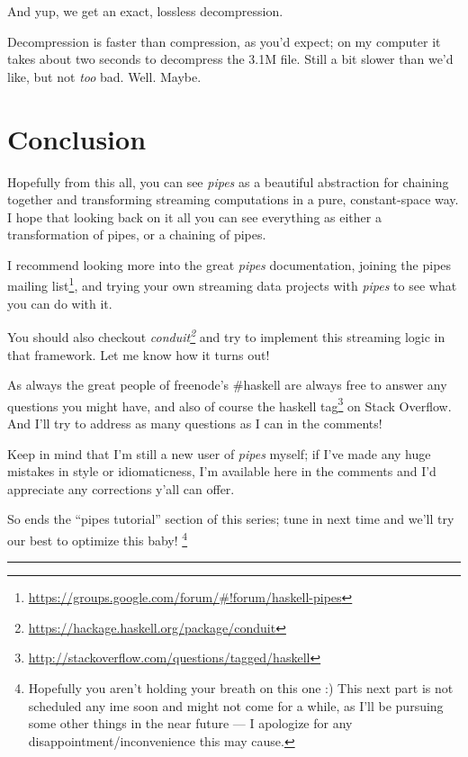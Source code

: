\documentclass[]{article}
\renewcommand{\href}[2]{#2\footnote{\url{#1}}}
\begin{document}
And yup, we get an exact, lossless decompression.

Decompression is faster than compression, as you'd expect; on my computer it
takes about two seconds to decompress the 3.1M file. Still a bit slower than
we'd like, but not \emph{too} bad. Well. Maybe.

\section{Conclusion}\label{conclusion}

Hopefully from this all, you can see \emph{pipes} as a beautiful abstraction for
chaining together and transforming streaming computations in a pure,
constant-space way. I hope that looking back on it all you can see everything as
either a transformation of pipes, or a chaining of pipes.

I recommend looking more into the great \emph{pipes} documentation, joining the
\href{https://groups.google.com/forum/\#!forum/haskell-pipes}{pipes mailing
list}, and trying your own streaming data projects with \emph{pipes} to see what
you can do with it.

You should also checkout
\emph{\href{https://hackage.haskell.org/package/conduit}{conduit}} and try to
implement this streaming logic in that framework. Let me know how it turns out!

As always the great people of freenode's \#haskell are always free to answer any
questions you might have, and also of course the
\href{http://stackoverflow.com/questions/tagged/haskell}{haskell tag} on Stack
Overflow. And I'll try to address as many questions as I can in the comments!

Keep in mind that I'm still a new user of \emph{pipes} myself; if I've made any
huge mistakes in style or idiomaticness, I'm available here in the comments and
I'd appreciate any corrections y'all can offer.

So ends the ``pipes tutorial'' section of this series; tune in next time and
we'll try our best to optimize this baby! \footnote{Hopefully you aren't holding
  your breath on this one :) This next part is not scheduled any ime soon and
  might not come for a while, as I'll be pursuing some other things in the near
  future --- I apologize for any disappointment/inconvenience this may cause.}

\begin{center}\rule{0.5\linewidth}{0.5pt}\end{center}
\end{document}
